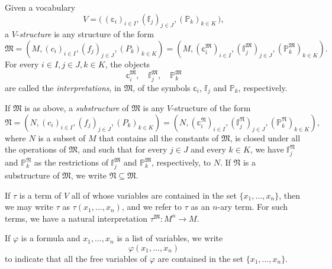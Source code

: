 \documentclass{scrartcl}
\renewcommand{\phi}{\varphi}
\newcommand{\FM}{\mathfrak{M}}
\newcommand{\FN}{\mathfrak{N}}
\begin{document}
\begin{definition}
Given a vocabulary
\[
V = \big(\,(\mathbb{c}_i)_{i\in I}, (\mathbb{f}_j)_{j\in J}, (\mathbb{P}_k)_{k\in K}\,\big),
\]
a $V$-\emph{structure} is any structure of the form 
\[
\mathfrak{M} =  \left( M, (c_i)_{i\in I}, (f_j)_{j\in J}, (P_k)_{k\in K}\right) = 
\left( M, (\mathbb{c}_i^{\mathfrak{M}})_{i\in I}, (\mathbb{f}_j^{\mathfrak{M}})_{j\in J}, (\mathbb{P}_k^{\mathfrak{M}})_{k\in K}\right)
\text{.}
\]
For every $i\in I,j\in J,k\in K$, the objects
\[
\mathbb{c}_i^{\mathfrak{M}}, \quad \mathbb{f}_j^{\mathfrak{M}}, \quad\mathbb{P}_k^{\mathfrak{M}}
\]
are called the \emph{interpretations}, in $\FM$, of  the symbols $\mathbb{c}_i$,  $\mathbb{f}_j$ and $\mathbb{P}_k$, respectively.


If $\FM$ is as above, a \emph{substructure} of $\FM$ is any $V$-structure of the form
\[
\mathfrak{N} =  \left( N, (c_i)_{i\in I}, (f_j)_{j\in J}, (P_k)_{k\in K}\right) = \left( N, (\mathbb{c}^{\mathfrak{N}}_i)_{i\in I},(\mathbb{f}^{\mathfrak{N}}_j)_{j\in J}, (\mathbb{P}^{\mathfrak{N}}_k)_{k\in K} \right),
\]
where $N$ is a subset of $M$ that contains all the constants of $\mathfrak{M}$, is closed under all the operations of $\mathfrak{M}$, and such that for every $j\in J$ and every $k\in K$, we have
$\mathbb{f}_j^{\mathfrak{N}}$ and  $\mathbb{P}_k^{\mathfrak{N}}$ as the restrictions of $\mathbb{f}_j^{\mathfrak{M}}$ and  $\mathbb{P}_k^{\mathfrak{M}}$, respectively, to $N$. If $\FN$ is a substructure of $\FM$, we write
$\FN\subseteq \FM$.

\end{definition}

If $\tau$ is a term of $V$ all of whose variables are contained in the set $\{x_1,\dots, x_n\}$, then we may write $\tau$ as $\tau(x_1,\dots,x_n)$, and we refer to $\tau$ as an $n$-ary term.  For such terms, we have a natural interpretation $\tau^{\mathfrak{M}}:M^n\to M$. 

\begin{notation}
If $\varphi$ is a formula and $x_1,\dots,x_n$ is a list of variables, we write 
\[
\varphi(x_1,\dots,x_n)
\]
to indicate that all the free variables of $\phi$ are contained in the set $\{x_1,\dots, x_n\}$.
\end{notation}
\end{document}
